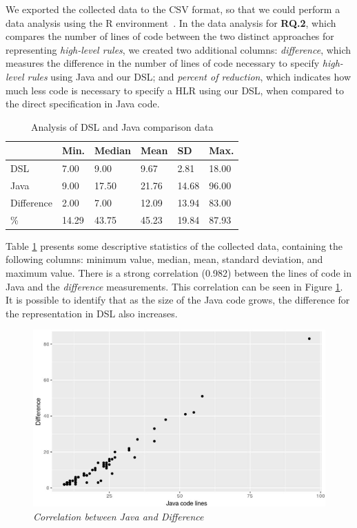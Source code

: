 \documentclass{bmcart}
\newcommand{\callers}{\emph{high-level rules}\xspace}
\newcommand{\shc}{HLR\xspace}
\begin{document}
We exported the collected data to the CSV format, so that we could perform a data analysis using the R environment~\cite{crawley2013}. In the data analysis for \textbf{RQ.2}, which compares the number of lines of code between the two distinct approaches for representing \callers, we created two additional columns: \emph{difference}, which measures the difference in the number of lines of code necessary to specify \callers using Java and our DSL; and \emph{percent of reduction}, which indicates 
how much less code is necessary to specify a \shc using our DSL, when compared to the direct specification in Java code.

\begin{table}[htb!]
	\centering
	\caption{Analysis of DSL and Java comparison data}
	\label{table:analiseComparacao}
	\begin{center}
		\begin{tabular}{llllll}
			\toprule
			& \textbf{Min.}  & \textbf{Median} & \textbf{Mean}  & \textbf{SD}    & \textbf{Max.}  \\ \midrule
			DSL        & 7.00  & 9.00   & 9.67  & 2.81  & 18.00 \\ %
			Java       & 9.00  & 17.50  & 21.76 & 14.68 & 96.00 \\ %
			Difference & 2.00  & 7.00   & 12.09 & 13.94 & 83.00 \\ %
			\%         & 14.29 & 43.75  & 45.23 & 19.84 & 87.93 \\ \bottomrule
		\end{tabular}
	\end{center}
\end{table}

Table \ref{table:analiseComparacao} presents some descriptive statistics of the collected data, containing the following columns: minimum value, median, mean, standard deviation, and maximum value. There is a strong correlation (0.982) between the lines of code in Java and the \emph{difference} measurements. This correlation can be seen in Figure \ref{fig:correlacao}. It is possible to identify that as the size of the Java code grows, the difference for the representation in DSL also increases.

\begin{figure}[htb!] 
	\centering
	\includegraphics[width=.48\textwidth]
	{img/artigo_correlacao.jpg}
	\caption{\it Correlation between Java and Difference}
	\label{fig:correlacao}
\end{figure}
\end{document}

